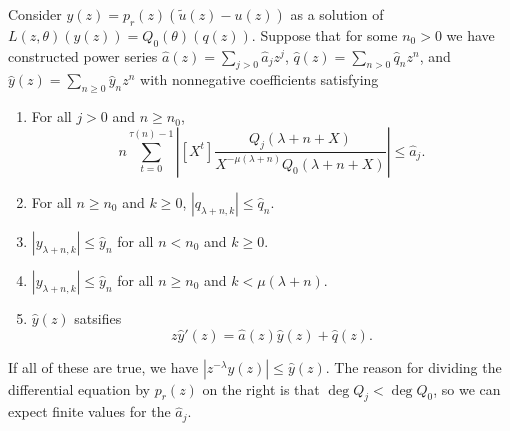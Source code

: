 \documentclass[10pt]{article}
\begin{document}
Consider
$y(z) = p_r(z)(\tilde{u}(z) - u(z))$ as a solution of $L(z, \theta)(y(z)) = Q_0(\theta)(q(z))$. Suppose that for some $n_0 > 0$ we have constructed power series $\hat{a}(z) = \sum_{j>0} \hat{a}_j z^j$, $\hat{q}(z)  = \sum_{n>0} \hat{q}_n z^n$, and $\hat{y}(z) = \sum_{n \ge 0} \hat{y}_n z^n$ with nonnegative coefficients satisfying
\begin{enumerate}
\item For all $j > 0$ and $n \ge n_0$,
\begin{equation*}
n \sum_{t=0}^{\tau(n) - 1} \left| [X^t] \frac{Q_j(\lambda+n+X)}{X^{-\mu(\lambda+n)}Q_0(\lambda+n+X)} \right| \le  \hat{a}_j \text{.}
\end{equation*}
\item For all $n \ge n_0$ and $k \ge 0$, $| q_{\lambda+n,k}| \le \hat{q}_n$.
\item $|y_{\lambda+n,k}| \le \hat{y}_n$ for all $n < n_0$ and $k \ge 0$.
\item $|y_{\lambda+n,k}| \le \hat{y}_n$ for all $n \ge n_0$ and $k < \mu(\lambda + n)$.
\item $\hat{y}(z)$ satsifies
\begin{equation*}
z \hat{y}'(z) = \hat{a}(z) \hat{y}(z) + \hat{q}(z)\text{.}
\end{equation*}
\end{enumerate}
If all of these are true, we have $|z^{-\lambda} y(z)| \le \hat{y}(z)$. The reason for dividing the differential equation by $p_r(z)$ on the right is that $\deg Q_j < \deg Q_0$, so we can expect finite values for the $\hat{a}_j$.
\end{document}
